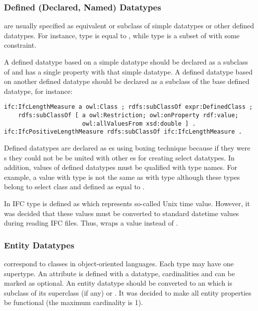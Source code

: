 \subsubsection{Defined (Declared, Named) Datatypes} are usually specified as equivalent or subclass of simple data\-types or other defined data\-types. For instance, type  is equal to , while type  is a subset of  with some constraint.

A defined data\-type based on a simple data\-type should be declared as a subclass of  and has a single property  with that simple data\-type. A defined data\-type based on another defined data\-type should be declared as a subclass of the base defined data\-type, for instance:

\begin{lstlisting}
ifc:IfcLengthMeasure a owl:Class ; rdfs:subClassOf expr:DefinedClass ;
    rdfs:subClassOf [ a owl:Restriction; owl:onProperty rdf:value;
                      owl:allValuesFrom xsd:double ] .
ifc:IfcPositiveLengthMeasure rdfs:subClassOf ifc:IfcLengthMeasure .
\end{lstlisting}


Defined data\-types are declared as es using boxing technique because if they were s they could not be be united with other es for creating select data\-types. In addition, values of defined data\-types must be qualified with type names. For example, a  value with type  is not the same as with type  although these types belong to select class  and defined as equal to .

In IFC type  is defined as  which represents so-called Unix time value. However, it was decided that these values must be converted to standard datetime values during reading IFC files. Thus,  wraps a  value instead of .



\subsubsection{Entity Datatypes} correspond to classes in object-oriented languages. Each type may have one super\-type. An attribute is defined with a data\-type, cardinalities and can be marked as optional. An entity data\-type should be converted to an  which is subclass of its superclass (if any) or . It was decided to make all entity properties be functional (the maximum cardinality is 1). 

